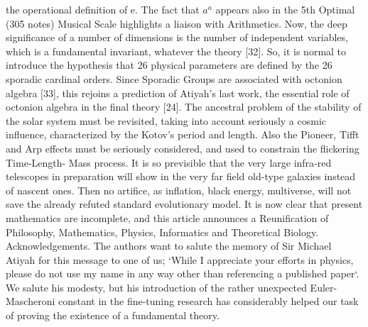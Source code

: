 the operational definition of e. The fact that $a^{a}$ appears also in the 5th Optimal (305 notes) Musical
Scale highlights a liaison with Arithmetics.
Now, the deep significance of a number of dimensions is the number of independent variables,
which is a fundamental invariant, whatever the theory [32]. So, it is normal to introduce the
hypothesis that 26 physical parameters are defined by the 26 sporadic cardinal orders. Since
Sporadic Groups are associated with octonion algebra [33], this rejoins a prediction of Atiyah's last
work, the essential role of octonion algebra in the final theory [24].
The ancestral problem of the stability of the solar system must be revisited, taking into account
seriously a cosmic influence, characterized by the Kotov's period and length. Also the Pioneer, Tifft
and Arp effects must be seriously considered, and used to constrain the flickering Time-Length-
Mass process.
It is so previsible that the very large infra-red telescopes in preparation will show in the very far
field old-type galaxies instead of nascent ones. Then no artifice, as inflation, black energy,
multiverse, will not save the already refuted standard evolutionary model.
It is now clear that present mathematics are incomplete, and this article announces a
Reunification of Philosophy, Mathematics, Physics, Informatics and Theoretical Biology.
Acknowledgements. The authors want to salute the memory of Sir Michael Atiyah for this message
to one of us; `While I appreciate your efforts in physics, please do not use my name in any way
other than referencing a published paper`. We salute his modesty, but his introduction of the rather
unexpected Euler-Mascheroni constant in the fine-tuning research has considerably helped our task
of proving the existence of a fundamental theory.
